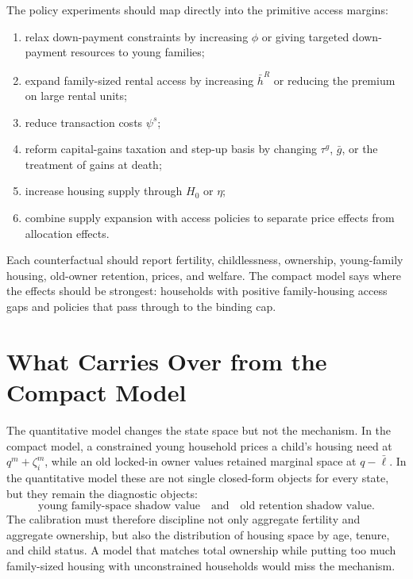 \documentclass[11pt]{article}
\newcommand{\1}{\mathbf 1}
\begin{document}
The policy experiments should map directly into the primitive access margins:
\begin{enumerate}
\item relax down-payment constraints by increasing $\phi$ or giving targeted
down-payment resources to young families;
\item expand family-sized rental access by increasing $\bar h^R$ or reducing
the premium on large rental units;
\item reduce transaction costs $\psi^s$;
\item reform capital-gains taxation and step-up basis by changing $\tau^g$,
$\bar g$, or the treatment of gains at death;
\item increase housing supply through $H_0$ or $\eta$;
\item combine supply expansion with access policies to separate price effects
from allocation effects.
\end{enumerate}
Each counterfactual should report fertility, childlessness, ownership,
young-family housing, old-owner retention, prices, and welfare. The compact
model says where the effects should be strongest: households with positive
family-housing access gaps and policies that pass through to the binding cap.

\section{What Carries Over from the Compact Model}

The quantitative model changes the state space but not the mechanism. In the
compact model, a constrained young household prices a child's housing need at
$q^m+\zeta_i^m$, while an old locked-in owner values retained marginal space at
$q-\bar\ell$. In the quantitative model these are not single closed-form
objects for every state, but they remain the diagnostic objects:
\[
\text{young family-space shadow value}
\quad\text{and}\quad
\text{old retention shadow value}.
\]
The calibration must therefore discipline not only aggregate fertility and
aggregate ownership, but also the distribution of housing space by age, tenure,
and child status. A model that matches total ownership while putting too much
family-sized housing with unconstrained households would miss the mechanism.

\clearpage


\end{document}
